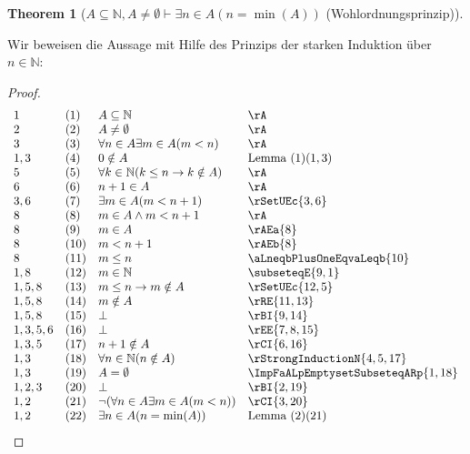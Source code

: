 \documentclass{book}
\theoremstyle{plain}
\newtheorem{theorem}{Theorem}
\theoremstyle{remark}
\theoremstyle{definition}
\begin{document}
\label{ASubseteqNaturalwANotEqualsEmptysetImpExnInALpnEqualsMinLpARpRp}
\begin{theorem}[\(A\subseteq\mathbb{N},A\neq\emptyset\vdash\exists n\in A(n=\min(A))\) (Wohlordnungsprinzip)]
\end{theorem}
Wir beweisen die Aussage mit Hilfe des Prinzips der starken Induktion über \(n\in\mathbb{N}\):
\begin{proof}
	\[
	\begin{array}{llll}
        1  & (1) & A\subseteq\mathbb{N}  & \rA \\
		2  & (2) & A\neq\emptyset        & \rA \\
        3  & (3) & \forall n\in A\exists m\in A(m<n) & \rA \\
        1,3& (4) & 0\notin A & \text{Lemma (1)}(1,3) \\
        5  & (5) & \forall k\in\mathbb{N}(k\leq n\rightarrow k\notin A) & \rA \\
        6  & (6) & n+1\in A & \rA \\
        3,6& (7) & \exists m\in A(m<n+1)    & \rSetUEc{3,6} \\
        8  & (8) & m\in A\land m<n+1        & \rA \\
        8  & (9) & m\in A                   & \rAEa{8} \\
        8  & (10) & m<n+1                   & \rAEb{8} \\
        8  & (11) & m\leq n                 & \aLneqbPlusOneEqvaLeqb{10} \\
        1,8& (12) & m\in\mathbb{N}          & \subseteqE{9,1} \\
        1,5,8& (13) & m\leq n\rightarrow m\notin A          & \rSetUEc{12,5} \\
        1,5,8& (14) & m\notin A          & \rRE{11,13} \\
        1,5,8& (15) & \bot          & \rBI{9,14} \\
        1,3,5,6& (16) & \bot          & \rEE{7,8,15} \\
        1,3,5& (17) & n+1\notin A      & \rCI{6,16} \\
        1,3& (18) & \forall n\in\mathbb{N}(n\notin A)      & \rStrongInductionN{4,5,17} \\
        1,3& (19) & A=\emptyset      & \ImpFaALpEmptysetSubseteqARp{1,18} \\
        1,2,3& (20) & \bot      & \rBI{2,19} \\
        1,2 & (21) & \neg(\forall n\in A\exists m\in A(m<n))      & \rCI{3,20} \\
        1,2 & (22) & \exists n\in A(n=\min(A))      & \text{Lemma (2)}(21) \\
	\end{array}
	\]
\end{proof}
\end{document}
